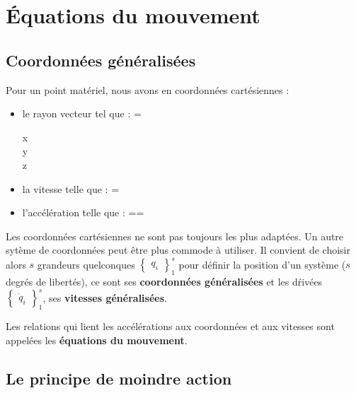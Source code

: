 \chapter{\'Equations du mouvement}
\section{Coordonn\'ees g\'en\'eralis\'ees}

Pour un point mat\'eriel, nous avons en coordonn\'ees cart\'esiennes :
\begin{itemize}
\item le rayon vecteur tel que :
	\be
		=\begin{pmatrix} x \\ y \\ z \end{pmatrix}
	\ee
\item la vitesse telle que :
	\be
		=
	\ee
\item l'acc\'el\'eration telle que :
	\be
		==
	\ee
\end{itemize}

Les coordonn\'ees cart\'esiennes ne sont pas toujours les plus adapt\'ees. Un autre syt\`eme de coordonn\'ees peut \^etre plus commode \`a utiliser. Il convient de choisir alors $s$ grandeurs quelconques $\begin{Bmatrix}q_{i}\end{Bmatrix}^{s}_{1}$ pour d\'efinir la position d'un syst\`eme ($s$ degr\'es de libert\'es), ce sont ses \textbf{coordonn\'ees g\'en\'eralis\'ees} et les d\'riv\'ees $\begin{Bmatrix}\dot{q}_{i}\end{Bmatrix}^{s}_{1}$, ses \textbf{vitesses g\'en\'eralis\'ees}.

Les relations qui lient les acc\'el\'erations aux coordonn\'ees et aux vitesses sont appel\'ees les \textbf{\'equations du mouvement}.

\section{Le principe de moindre action}
